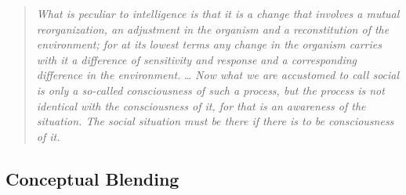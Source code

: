\documentclass{AISB2008}
\newcommand*{\sourceatright}[1]{\unskip\hspace{1em plus 1fill}%
\nolinebreak[3]\hspace*{\fill}\mbox{#1}}%
\begin{document}
\begin{quote}
\emph{What is peculiar to intelligence is that it is a change that
  involves a mutual reorganization, an adjustment in the organism and
  a reconstitution of the environment; for at its lowest terms any
  change in the organism carries with it a difference of sensitivity
  and response and a corresponding difference in the environment.} \ldots
%
%
\emph{Now what we are accustomed to call social is only a so-called
consciousness of such a process, but the process is not identical
   with the consciousness of it, for that is an awareness of the
   situation. The social situation must be there if there is to be
   consciousness of it.}
\sourceatright{\cite[pp. 4, 48]{mead1932philosophy}}
\end{quote}
%

\subsection{Conceptual Blending} \label{sec:blend}
\end{document}
